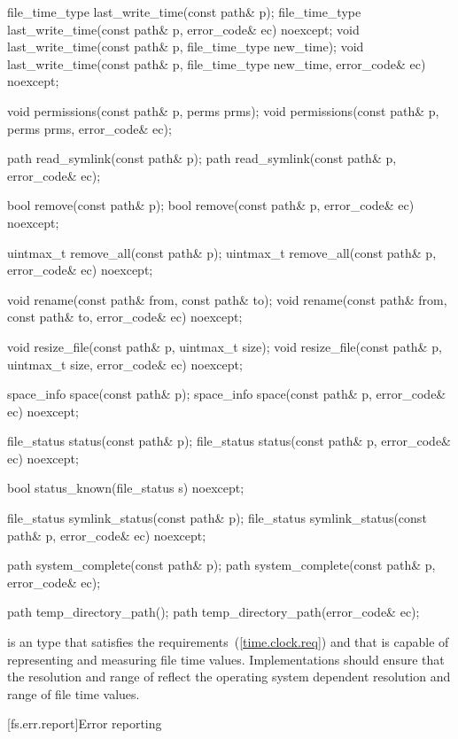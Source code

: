 \begin{codeblock}
{  file_time_type last_write_time(const path& p);
  file_time_type last_write_time(const path& p, error_code& ec) noexcept;
  void last_write_time(const path& p, file_time_type new_time);
  void last_write_time(const path& p, file_time_type new_time,
                       error_code& ec) noexcept;

  void permissions(const path& p, perms prms);
  void permissions(const path& p, perms prms, error_code& ec);

  path read_symlink(const path& p);
  path read_symlink(const path& p, error_code& ec);

  bool remove(const path& p);
  bool remove(const path& p, error_code& ec) noexcept;

  uintmax_t remove_all(const path& p);
  uintmax_t remove_all(const path& p, error_code& ec) noexcept;

  void rename(const path& from, const path& to);
  void rename(const path& from, const path& to, error_code& ec) noexcept;

  void resize_file(const path& p, uintmax_t size);
  void resize_file(const path& p, uintmax_t size, error_code& ec) noexcept;

  space_info space(const path& p);
  space_info space(const path& p, error_code& ec) noexcept;

  file_status status(const path& p);
  file_status status(const path& p, error_code& ec) noexcept;

  bool status_known(file_status s) noexcept;

  file_status symlink_status(const path& p);
  file_status symlink_status(const path& p, error_code& ec) noexcept;

  path system_complete(const path& p);
  path system_complete(const path& p, error_code& ec);

  path temp_directory_path();
  path temp_directory_path(error_code& ec);
}
\end{codeblock}

\pnum
{} is an  type
that satisfies the  requirements~(\ref{time.clock.req})
and that is capable of representing and measuring file time values.
Implementations should ensure that the resolution and range of
 reflect the operating system dependent resolution and range
of file time values.

[fs.err.report]{Error reporting}

